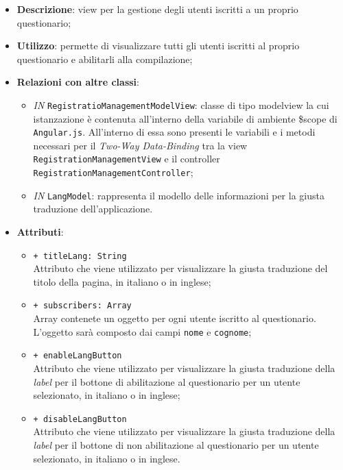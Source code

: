 \begin{itemize}
	\item \textbf{Descrizione}: view per la gestione degli utenti iscritti a un proprio questionario;
	\item \textbf{Utilizzo}: permette di visualizzare tutti gli utenti iscritti al proprio questionario e abilitarli alla compilazione;
	\item \textbf{Relazioni con altre classi}:
	\begin{itemize}
		\item \textit{IN} \texttt{RegistratioManagementModelView}: classe di tipo modelview la cui istanzazione è contenuta all'interno della variabile di ambiente \$scope di \texttt{Angular.js}. All'interno di essa sono presenti le variabili e i metodi necessari per il \textit{Two-Way Data-Binding} tra la view \texttt{RegistrationManagementView} e il controller \texttt{RegistrationManagementController}; 
		\item \textit{IN} \texttt{LangModel}: rappresenta il modello delle informazioni per la giusta traduzione dell'applicazione.
	\end{itemize}
		\item \textbf{Attributi}:
		\begin{itemize}
			\item \texttt{+ titleLang: String} \\ Attributo che viene utilizzato per visualizzare la giusta traduzione del titolo della pagina, in italiano o in inglese; 
			\item \texttt{+ subscribers: Array} \\ Array contenete un oggetto per ogni utente iscritto al questionario. L'oggetto sarà composto dai campi \texttt{nome} e \texttt{cognome};
			\item \texttt{+ enableLangButton} \\ Attributo che viene utilizzato per visualizzare la giusta traduzione della \textit{label} per il bottone di abilitazione al questionario per un utente selezionato, in italiano o in inglese;
			\item \texttt{+ disableLangButton} \\ Attributo che viene utilizzato per visualizzare la giusta traduzione della \textit{label} per il bottone di non abilitazione al questionario per un utente selezionato, in italiano o in inglese.
		\end{itemize}
\end{itemize}


